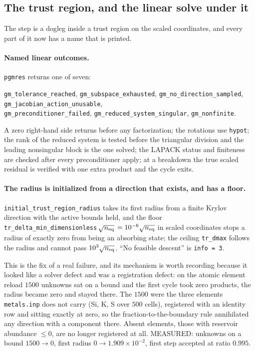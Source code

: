 \documentclass[english,a4paper]{my_memo}
\newcommand{\code}[1]{\texttt{#1}}
\begin{document}
\subsection{The trust region, and the linear solve under it}
\label{sec:tr}

The step is a dogleg inside a trust region on the scaled coordinates, and
every part of it now has a name that is printed.

\paragraph{Named linear outcomes.} \code{pgmres} returns one of seven:

\begin{center}\small
\code{gm\_tolerance\_reached}, \code{gm\_subspace\_exhausted},
\code{gm\_no\_direction\_sampled}, \code{gm\_jacobian\_action\_unusable},\\
\code{gm\_preconditioner\_failed}, \code{gm\_reduced\_system\_singular},
\code{gm\_nonfinite}.
\end{center}

\noindent A zero right-hand side returns before any
factorization; the rotations use \code{hypot}; the rank of the reduced system
is tested before the triangular division and the leading nonsingular block is
the one solved; the LAPACK status and finiteness are checked after every
preconditioner apply; at a breakdown the true scaled residual is verified
with one extra product and the cycle exits.

\paragraph{The radius is initialized from a direction that exists, and has a
floor.} \code{initial\_trust\_region\_radius} takes its first radius from a
finite Krylov direction with the active bounds held, and the floor
\code{tr\_delta\_min\_dimensionless}\,$\sqrt{n_{\rm eq}}$ $= 10^{-6}\sqrt{n_{\rm eq}}$ in scaled coordinates stops
a radius of exactly zero from being an absorbing state; the ceiling
\code{tr\_dmax} follows the radius and cannot pass
$10^{3}\sqrt{n_{\rm eq}}$. ``No feasible descent'' is \code{info = 3}.

This is the fix of a real failure, and its mechanism is worth recording
because it looked like a solver defect and was a registration defect: on the
atomic element reload $1500$ unknowns sat on a bound and the first cycle took
zero products, the radius became zero and stayed there. The $1500$ were the
three elements \code{metals.inp} does not carry (Si, K, S over $500$ cells),
registered with an identity row and sitting exactly at zero, so the
fraction-to-the-boundary rule annihilated any direction with a component
there. Absent elements, those with reservoir abundance $\le 0$, are no longer
registered at all. MEASURED: unknowns on a bound $1500 \rightarrow 0$, first
radius $0 \rightarrow 1.909\times10^{-2}$, first step accepted at ratio
$0.995$.
\end{document}
